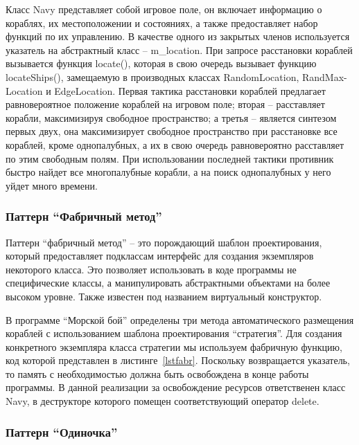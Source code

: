 \documentclass[12pt, a4paper, oneside]{article}
\begin{document}
Класс Navy представляет собой игровое поле, он включает информацию о кораблях, их местоположении и состояниях, а также предоставляет набор функций по их управлению. В качестве одного из закрытых членов используется указатель на абстрактный класс -- m\_location. При запросе расстановки кораблей вызывается функция locate(), которая в свою очередь вызывает функцию locateShips(), замещаемую в производных классах RandomLocation, RandMax-Location и EdgeLocation. Первая тактика расстановки кораблей предлагает равновероятное положение кораблей на игровом поле; вторая --  расставляет корабли, максимизируя свободное пространство; а третья -- является синтезом первых двух, она максимизирует свободное пространство при расстановке все кораблей, кроме однопалубных, а их в свою очередь равновероятно расставляет по этим свободным полям. При использовании последней тактики противник быстро найдет все многопалубные корабли, а на поиск однопалубных у него уйдет много времени.

\subsubsection{Паттерн ``Фабричный метод''}
\begin{figure}[h!]

\end{figure}
Паттерн ``фабричный метод'' -- это порождающий шаблон проектирования, который предоставляет подклассам интерфейс для создания экземпляров некоторого класса. Это позволяет использовать в коде программы не специфические классы, а манипулировать абстрактными объектами на более высоком уровне. Также известен под названием виртуальный конструктор.

В программе ``Морской бой'' определены три метода автоматического размещения кораблей с использованием шаблона проектирования ``стратегия''. Для создания конкретного экземпляра класса стратегии мы используем фабричную функцию, код которой представлен в листинге~\ref{lstfabr}. Поскольку возвращается указатель, то память с необходимостью должна быть освобождена в конце работы программы. В данной реализации за освобождение ресурсов ответственен класс Navy, в деструкторе которого помещен соответствующий оператор delete. 


\subsubsection{Паттерн ``Одиночка''}
\end{document}
